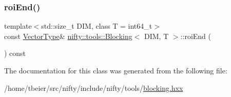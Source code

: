 \subsubsection{\texorpdfstring{roi\+End()}{roiEnd()}}
{\footnotesize\ttfamily template$<$std\+::size\+\_\+t D\+IM, class T  = int64\+\_\+t$>$ \\
const \hyperlink{classnifty_1_1tools_1_1Blocking_a5f8df3d4cdf09803217d729a04018fb3}{Vector\+Type}\& \hyperlink{classnifty_1_1tools_1_1Blocking}{nifty\+::tools\+::\+Blocking}$<$ D\+IM, T $>$\+::roi\+End (\begin{DoxyParamCaption}{ }\end{DoxyParamCaption}) const\hspace{0.3cm}{\ttfamily [inline]}}



The documentation for this class was generated from the following file\+:\begin{DoxyCompactItemize}
\item 
/home/tbeier/src/nifty/include/nifty/tools/\hyperlink{blocking_8hxx}{blocking.\+hxx}\end{DoxyCompactItemize}
